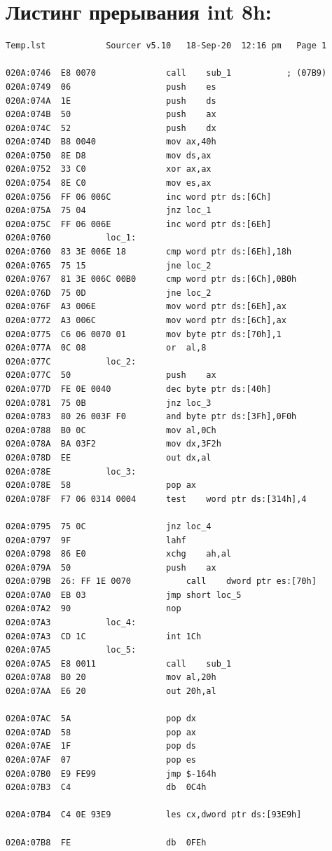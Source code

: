 \documentclass{article}
\begin{document}
\section{Листинг прерывания int 8h: }
\begin{lstlisting}[label=some-code,caption=Листинг перывания int 8h]
Temp.lst			Sourcer	v5.10   18-Sep-20  12:16 pm   Page 1

020A:0746  E8 0070				call	sub_1			; (07B9)
020A:0749  06					push	es
020A:074A  1E					push	ds
020A:074B  50					push	ax
020A:074C  52					push	dx
020A:074D  B8 0040				mov	ax,40h
020A:0750  8E D8				mov	ds,ax
020A:0752  33 C0				xor	ax,ax		
020A:0754  8E C0				mov	es,ax
020A:0756  FF 06 006C			inc	word ptr ds:[6Ch]	
020A:075A  75 04				jnz	loc_1		
020A:075C  FF 06 006E			inc	word ptr ds:[6Eh]
020A:0760			loc_1:
020A:0760  83 3E 006E 18		cmp	word ptr ds:[6Eh],18h
020A:0765  75 15				jne	loc_2			
020A:0767  81 3E 006C 00B0		cmp	word ptr ds:[6Ch],0B0h	
020A:076D  75 0D				jne	loc_2			
020A:076F  A3 006E				mov	word ptr ds:[6Eh],ax	
020A:0772  A3 006C				mov	word ptr ds:[6Ch],ax	
020A:0775  C6 06 0070 01		mov	byte ptr ds:[70h],1
020A:077A  0C 08				or	al,8
020A:077C			loc_2:
020A:077C  50					push	ax
020A:077D  FE 0E 0040			dec	byte ptr ds:[40h]	
020A:0781  75 0B				jnz	loc_3		
020A:0783  80 26 003F F0		and	byte ptr ds:[3Fh],0F0h	
020A:0788  B0 0C				mov	al,0Ch
020A:078A  BA 03F2				mov	dx,3F2h
020A:078D  EE					out	dx,al		
020A:078E			loc_3:
020A:078E  58					pop	ax
020A:078F  F7 06 0314 0004		test	word ptr ds:[314h],4	 

020A:0795  75 0C				jnz	loc_4			
020A:0797  9F					lahf				
020A:0798  86 E0				xchg	ah,al
020A:079A  50					push	ax
020A:079B  26: FF 1E 0070			call	dword ptr es:[70h]
020A:07A0  EB 03				jmp	short loc_5
020A:07A2  90					nop
020A:07A3			loc_4:
020A:07A3  CD 1C				int	1Ch		
020A:07A5			loc_5:
020A:07A5  E8 0011				call	sub_1		
020A:07A8  B0 20				mov	al,20h		
020A:07AA  E6 20				out	20h,al			
										
020A:07AC  5A					pop	dx
020A:07AD  58					pop	ax
020A:07AE  1F					pop	ds
020A:07AF  07					pop	es
020A:07B0  E9 FE99				jmp	$-164h
020A:07B3  C4					db	0C4h
							                       
020A:07B4  C4 0E 93E9			les	cx,dword ptr ds:[93E9h]	

020A:07B8  FE					db	0FEh
\end{lstlisting}
\end{document}

